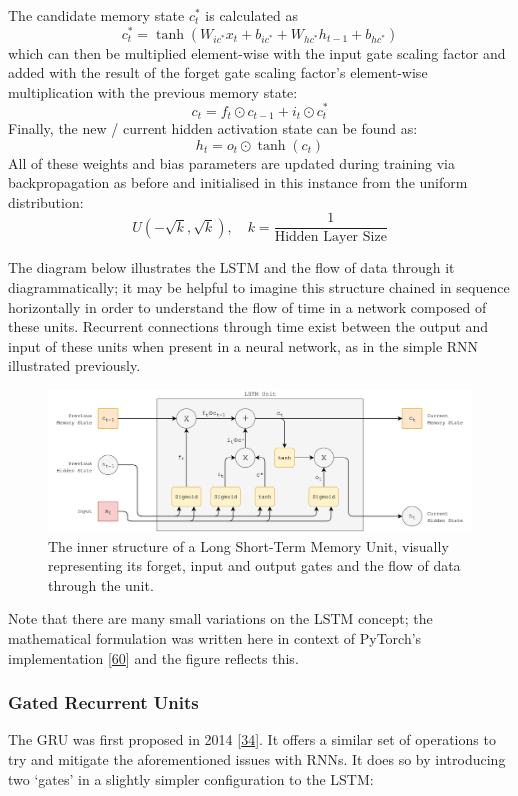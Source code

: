 \documentclass[12pt,]{article}
\begin{document}
The candidate memory state \(c^*_t\) is calculated as
\[c^*_t = \tanh(W_{ic^*} x_t + b_{ic^*} + W_{hc^*} h_{t-1} + b_{hc^*})\]
which can then be multiplied element-wise with the input gate scaling
factor and added with the result of the forget gate scaling factor's
element-wise multiplication with the previous memory state:
\[c_t = f_t \odot c_{t-1} + i_t \odot c^*_t\] Finally, the new / current
hidden activation state can be found as: \[h_t = o_t \odot \tanh(c_t)\]
All of these weights and bias parameters are updated during training via
backpropagation as before and initialised in this instance from the
uniform distribution:
\[U(-\sqrt{k}, \sqrt{k}),\quad k = \frac{1}{\text{Hidden Layer Size}}\]

The diagram below illustrates the LSTM and the flow of data through it
diagrammatically; it may be helpful to imagine this structure chained in
sequence horizontally in order to understand the flow of time in a
network composed of these units. Recurrent connections through time
exist between the output and input of these units when present in a
neural network, as in the simple RNN illustrated previously.

\begin{figure}
\centering
\includegraphics{Images/lstm.png}
\caption{The inner structure of a Long Short-Term Memory Unit, visually
representing its forget, input and output gates and the flow of data
through the unit.}
\end{figure}

Note that there are many small variations on the LSTM concept; the
mathematical formulation was written here in context of PyTorch's
implementation {[}\protect\hyperlink{ref-pytorchlstm}{60}{]} and the
figure reflects this.

\hypertarget{gated-recurrent-units}{%
\subsubsection{Gated Recurrent Units}\label{gated-recurrent-units}}

The GRU was first proposed in 2014
{[}\protect\hyperlink{ref-cho2014learning}{34}{]}. It offers a similar
set of operations to try and mitigate the aforementioned issues with
RNNs. It does so by introducing two `gates' in a slightly simpler
configuration to the LSTM:
\end{document}
